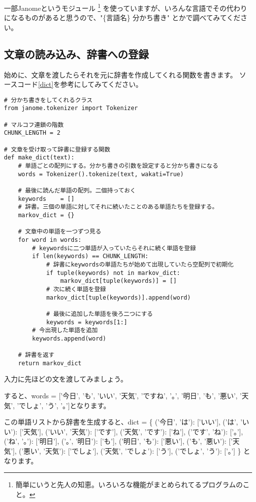 \documentclass{jsarticle}
\begin{document}
        一部Janomeというモジュール
        \footnote{簡単にいうと先人の知恵。いろいろな機能がまとめられてるプログラムのこと。}
        を使っていますが、いろんな言語でその代わりになるものがあると思うので、"\{言語名\} 分かち書き"
        とかで調べてみてください。

        \subsection*{文章の読み込み、辞書への登録}
            始めに、文章を渡したらそれを元に辞書を作成してくれる関数を書きます。
            ソースコード\ref{dict}を参考にしてみてください。

            \begin{lstlisting}[caption=辞書を作成する関数, label=dict]
# 分かち書きをしてくれるクラス
from janome.tokenizer import Tokenizer

# マルコフ連鎖の階数
CHUNK_LENGTH = 2
                
# 文章を受け取って辞書に登録する関数
def make_dict(text):
    # 単語ごとの配列にする。分かち書きの引数を設定すると分かち書きになる
    words = Tokenizer().tokenize(text, wakati=True)
                
    # 最後に読んだ単語の配列。二個持っておく
    keywords    = []
    # 辞書。三個の単語に対してそれに続いたことのある単語たちを登録する。
    markov_dict = {}
                
    # 文章中の単語を一つずつ見る
    for word in words:
        # keywordsに二つ単語が入っていたらそれに続く単語を登録
        if len(keywords) == CHUNK_LENGTH:
            # 辞書にkeywordsの単語たちが始めて出現していたら空配列で初期化
            if tuple(keywords) not in markov_dict:
                markov_dict[tuple(keywords)] = []
            # 次に続く単語を登録
            markov_dict[tuple(keywords)].append(word)

            # 最後に追加した単語を後ろ二つにする
            keywords = keywords[1:]
        # 今出現した単語を追加
        keywords.append(word)
    
    # 辞書を返す
    return markov_dict
            \end{lstlisting}

            入力に先ほどの文を渡してみましょう。

            すると、words = ['今日', 'も', 'いい', '天気', 'ですね', '。',
            '明日', 'も', '悪い', '天気', 'でしょ', 'う', '。']となります。

            この単語リストから辞書を生成すると、dict = \{
                ('今日', 'は'): ['いい'],
                ('は', 'いい'): ['天気'],
                ('いい', '天気'): ['です'],
                ('天気', 'です'): ['ね'],
                ('です', 'ね'): ['。'],
                ('ね', '。'): ['明日'],
                ('。', '明日'): ['も'],
                ('明日', 'も'): ['悪い'],
                ('も', '悪い'): ['天気'],
                ('悪い', '天気'): ['でしょ'],
                ('天気', 'でしょ'): ['う'],
                ('でしょ', 'う'): ['。']
            \}
            となります。
\end{document}
